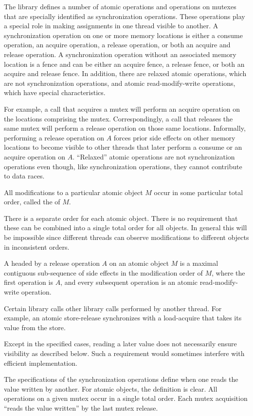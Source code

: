 \pnum
The library defines a number of atomic operations and
operations on mutexes that are specially identified as
synchronization operations. These operations play a special role in making
assignments in one thread visible to another. A synchronization operation on one
or more memory locations is either a consume operation, an acquire operation, a
release operation, or both an acquire and release operation. A synchronization
operation without an associated memory location is a fence and can be either an
acquire fence, a release fence, or both an acquire and release fence. In
addition, there are relaxed atomic operations, which are not synchronization
operations, and atomic read-modify-write operations, which have special
characteristics.
\begin{note}
For example, a call that acquires a mutex will
perform an acquire operation on the locations comprising the mutex.
Correspondingly, a call that releases the same mutex will perform a release
operation on those same locations. Informally, performing a release operation on
$A$ forces prior
%
side effects on other memory locations to become visible
to other threads that later perform a consume or an acquire operation on
$A$. ``Relaxed'' atomic operations are not synchronization operations even
though, like synchronization operations, they cannot contribute to data races.
\end{note}

\pnum
All modifications to a particular atomic object $M$ occur in some
particular total order, called the  of $M$.
\begin{note}
There is a separate order for each
atomic object. There is no requirement that these can be combined into a single
total order for all objects. In general this will be impossible since different
threads can observe modifications to different objects in inconsistent orders.
\end{note}

\pnum
A  headed
by a release operation $A$ on an atomic object $M$
is a maximal contiguous sub-sequence of
%
side effects in the modification order of $M$,
where the first operation is $A$, and
every subsequent operation is an atomic read-modify-write operation.

\pnum
Certain library calls  other library calls performed by
another thread. For example, an atomic store-release synchronizes with a
load-acquire that takes its value from the store.
\begin{note}
Except in the specified cases, reading a later value does not
necessarily ensure visibility as described below. Such a requirement would
sometimes interfere with efficient implementation.
\end{note}
\begin{note}
The
specifications of the synchronization operations define when one reads the value
written by another. For atomic objects, the definition is clear. All operations
on a given mutex occur in a single total order. Each mutex acquisition ``reads
the value written'' by the last mutex release.
\end{note}

